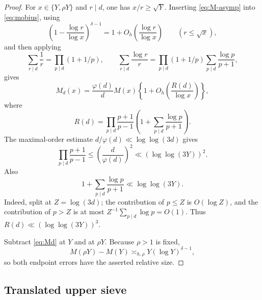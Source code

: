 \documentclass[10pt]{amsart}
\numberwithin{equation}{section}
\theoremstyle{remark}
\begin{document}
\begin{proof}
For \(x\in\{Y,\rho Y\}\) and \(r\mid d\), one has \(x/r\ge\sqrt Y\).
Inserting \eqref{eq:M-asymp} into \eqref{eq:mobius}, using
\[
 \left(1-\frac{\log r}{\log x}\right)^{\delta-1}
 =1+O_h\left(\frac{\log r}{\log x}\right)
 \qquad(r\le\sqrt x),
\]
and then applying
\[
 \sum_{r\mid d}\frac1r=\prod_{p\mid d}(1+1/p),
 \qquad
 \sum_{r\mid d}\frac{\log r}{r}
 =
 \prod_{p\mid d}(1+1/p)
 \sum_{p\mid d}\frac{\log p}{p+1},
\]
gives
\begin{equation}\label{eq:Md}
 M_d(x)=\frac{\varphi(d)}dM(x)
 \left\{1+O_h\left(\frac{R(d)}{\log x}\right)\right\},
\end{equation}
where
\[
 R(d)=
 \prod_{p\mid d}\frac{p+1}{p-1}
 \left(1+\sum_{p\mid d}\frac{\log p}{p+1}\right).
\]
The maximal-order estimate \(d/\varphi(d)\ll\log\log(3d)\) gives
\[
 \prod_{p\mid d}\frac{p+1}{p-1}
 \le\left(\frac d{\varphi(d)}\right)^2
 \ll(\log\log(3Y))^2.
\]
Also
\[
 1+\sum_{p\mid d}\frac{\log p}{p+1}
 \ll\log\log(3Y).
\]
Indeed, split at \(Z=\log(3d)\); the contribution of \(p\le Z\) is
\(O(\log Z)\), and the contribution of \(p>Z\) is at most
\(Z^{-1}\sum_{p\mid d}\log p=O(1)\). Thus
\(R(d)\ll(\log\log(3Y))^3\).

Subtract \eqref{eq:Md} at \(Y\) and at \(\rho Y\). Because \(\rho>1\) is
fixed,
\[
 M(\rho Y)-M(Y)\asymp_{h,\rho}Y(\log Y)^{\delta-1},
\]
so both endpoint errors have the asserted relative size.
\end{proof}

\subsection{Translated upper sieve}
\end{document}

